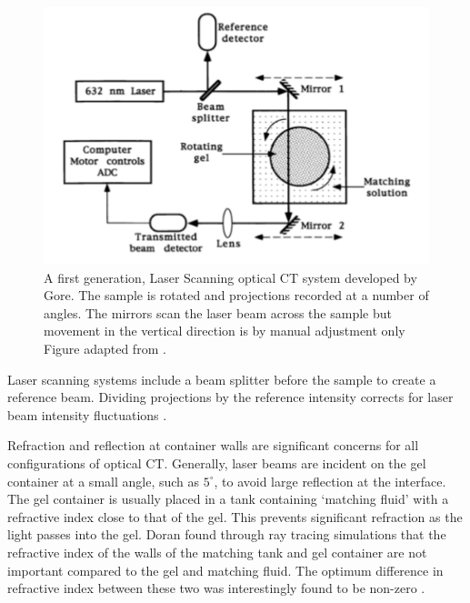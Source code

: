 	
	
	
	
	\begin{figure}[H]
		\centering
		\includegraphics[scale=0.6]{intro_img/Gore_setup.pdf}
		\caption{A first generation,  Laser Scanning optical CT system developed by Gore. The sample is rotated and projections recorded at a number of angles. The  mirrors scan the laser beam across the sample but movement in the vertical direction is by manual adjustment only Figure adapted from \cite{Gore:1999tg}. }
		\label{fig:gore_setup}
	\end{figure}
	
	
	Laser scanning systems include a  beam splitter before the sample to create a reference beam. Dividing projections by the reference intensity  corrects for laser beam intensity fluctuations \cite{Gore:1999tg}.
	
	Refraction and reflection at container walls are significant concerns for all configurations of  optical CT. Generally, laser beams are incident on the gel container at a small angle, such as $5^{\circ}$, to avoid large reflection at the interface. The gel container is usually placed in a tank containing `matching fluid' with a refractive index close to that of the gel. This prevents significant refraction as the light passes into the gel. Doran found through ray tracing simulations that the refractive index of the walls of the matching tank and  gel container are not important compared to the gel and matching fluid. The optimum difference in refractive index between these two was interestingly found to be non-zero \cite{Doran:2001ee}. 
	
